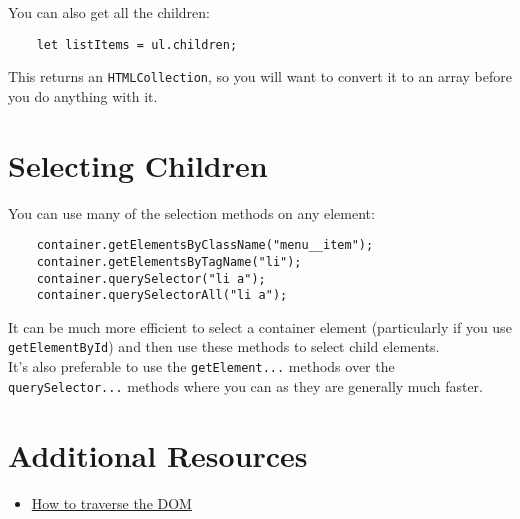 You can also get all the children:

\begin{verbatim}
    let listItems = ul.children;
\end{verbatim}

This returns an \texttt{HTMLCollection}, so you will want to convert it to an array before you do anything with it.



\section{Selecting Children}

You can use many of the selection methods on any element:

\begin{verbatim}
    container.getElementsByClassName("menu__item");
    container.getElementsByTagName("li");
    container.querySelector("li a");
    container.querySelectorAll("li a");
\end{verbatim}

It can be much more efficient to select a container element (particularly if you use \texttt{getElementById}) and then use these methods to select child elements.
\\

It's also preferable to use the \texttt{getElement...} methods over the \texttt{querySelector...} methods where you can as they are generally much faster.



\section{Additional Resources}

\begin{itemize}[leftmargin=*]
    \item \href{https://www.digitalocean.com/community/tutorials/how-to-traverse-the-dom}{How to traverse the DOM}
\end{itemize}
